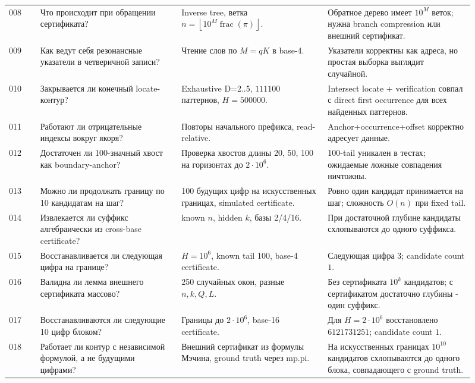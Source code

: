 \documentclass[11pt,a4paper]{article}
\newcommand{\floor}[1]{\left\lfloor #1 \right\rfloor}
\begin{document}
\begin{longtable}{p{0.06\linewidth}p{0.27\linewidth}p{0.29\linewidth}p{0.29\linewidth}}
008 & Что происходит при обращении сертификата? & Inverse tree, ветка $n=\floor{10^M\operatorname{frac}(\pi)}$. & Обратное дерево имеет $10^M$ веток; нужна branch compression или внешний сертификат. \\
009 & Как ведут себя резонансные указатели в четверичной записи? & Чтение слов по $M=qK$ в base-4. & Указатели корректны как адреса, но простая выборка выглядит случайной. \\
010 & Закрывается ли конечный locate-контур? & Exhaustive D=2..5, $111100$ паттернов, $H=500000$. & Intersect locate + verification совпал с direct first occurrence для всех найденных паттернов. \\
011 & Работают ли отрицательные индексы вокруг якоря? & Повторы начального префикса, read-relative. & Anchor+occurrence+offset корректно адресует данные. \\
012 & Достаточен ли 100-значный хвост как boundary-anchor? & Проверка хвостов длины 20, 50, 100 на горизонтах до $2\cdot10^6$. & 100-tail уникален в тестах; ожидаемые ложные совпадения ничтожны. \\
013 & Можно ли продолжать границу по 10 кандидатам на шаг? & 100 будущих цифр на искусственных границах, simulated certificate. & Ровно один кандидат принимается на шаг; сложность $O(n)$ при fixed tail. \\
014 & Извлекается ли суффикс алгебраически из cross-base certificate? & known $n$, hidden $k$, базы 2/4/16. & При достаточной глубине кандидаты схлопываются до одного суффикса. \\
015 & Восстанавливается ли следующая цифра на границе? & $H=10^6$, known tail 100, base-4 certificate. & Следующая цифра $3$; candidate count $1$. \\
016 & Валидна ли лемма внешнего сертификата массово? & 250 случайных окон, разные $n,k,Q,L$. & Без сертификата $10^k$ кандидатов; с сертификатом достаточно глубины - один суффикс. \\
017 & Восстанавливаются ли следующие 10 цифр блоком? & Границы до $2\cdot10^6$, base-16 certificate. & Для $H=2\cdot10^6$ восстановлено $6121731251$; candidate count $1$. \\
018 & Работает ли контур с независимой формулой, а не будущими цифрами? & Внешний сертификат из формулы Мэчина, ground truth через mp.pi. & На искусственных границах $10^{10}$ кандидатов схлопываются до одного блока, совпадающего с ground truth. \\
\bottomrule
\end{longtable}
\normalsize
\end{document}
